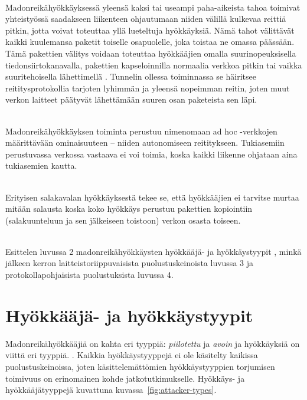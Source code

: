 \documentclass[finnish]{tktltiki2}
\theoremstyle{definition}
\theoremstyle{remark}
\begin{document}
\noindent \\
Madonreikähyökkäyksessä yleensä kaksi tai useampi paha-aikeista tahoa toimivat yhteistyössä saadakseen liikenteen ohjautumaan niiden välillä kulkevaa reittiä pitkin, jotta voivat toteuttaa yllä lueteltuja hyökkäyksiä. Nämä tahot välittävät kaikki kuulemansa paketit toiselle osapuolelle, joka toistaa ne omassa päässään. Tämä pakettien välitys voidaan toteuttaa hyökkääjien omalla suurinopeuksisella tiedonsiirtokanavalla, pakettien kapseloinnilla normaalia verkkoa pitkin tai vaikka suuritehoisella lähettimellä \cite{liteworp}. Tunnelin ollessa toiminnassa se häiritsee reititysprotokollia tarjoten lyhimmän ja yleensä nopeimman reitin, joten muut verkon laitteet päätyvät lähettämään suuren osan paketeista sen läpi. 

\noindent \\
Madonreikähyökkäyksen toiminta perustuu nimenomaan ad hoc -verkkojen määrittävään ominaisuuteen -- niiden autonomiseen reititykseen. Tukiasemiin perustuvassa verkossa vastaava ei voi toimia, koska kaikki liikenne ohjataan aina tukiasemien kautta.

\noindent \\
Erityisen salakavalan hyökkäyksestä tekee se, että hyökkääjien ei tarvitse murtaa mitään salausta koska koko hyökkäys perustuu pakettien kopiointiin (salakuunteluun ja sen jälkeiseen toistoon) verkon osasta toiseen.

\noindent \\
Esittelen luvussa 2 madonreikähyökkäysten hyökkääjä- \cite{delphi} ja hyökkäystyypit \cite{liteworp}, minkä jälkeen kerron laitteistoriippuvaisista puolustuskeinoista luvussa 3 ja protokollapohjaisista puolustuksista luvussa 4.

% 
% 
% 
% 
% 
% 
\section{Hyökkääjä- ja hyökkäystyypit}
% 
% 
% 
% 
% 
% 
% 
% 
% 
% 

Madonreikähyökkääjiä on kahta eri tyyppiä: \emph{piilotettu} ja \emph{avoin} \cite{delphi} ja hyökkäyksiä on viittä eri tyyppiä. \cite{liteworp}. Kaikkia hyökkäystyyppejä ei ole käsitelty kaikissa puolustuskeinoissa, joten käsittelemättömien hyökkäystyyppien torjumisen toimivuus on erinomainen kohde jatkotutkimukselle. Hyökkäys- ja hyökkääjätyyppejä kuvattuna kuvassa~\ref{fig:attacker-types}.
\end{document}
